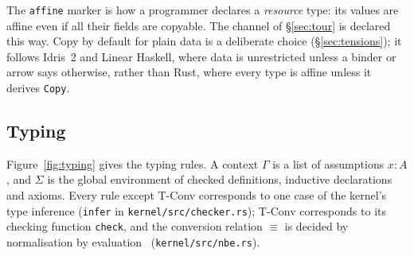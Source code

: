 The \lstinline|affine| marker is how a programmer declares a \emph{resource} type: its values are affine even if all their fields are copyable.
The channel of \S\ref{sec:tour} is declared this way.
Copy by default for plain data is a deliberate choice (\S\ref{sec:tensions}); it follows Idris~2 and Linear Haskell, where data is unrestricted unless a binder or arrow says otherwise, rather than Rust, where every type is affine unless it derives \lstinline|Copy|.

\subsection{Typing}\label{sec:core:typing}

Figure~\ref{fig:typing} gives the typing rules.
A context $\Gamma$ is a list of assumptions $x{:}A$, and $\Sigma$ is the global environment of checked definitions, inductive declarations and axioms.
Every rule except T-Conv corresponds to one case of the kernel's type inference (\texttt{infer} in \texttt{kernel/src/checker.rs}); T-Conv corresponds to its checking function \texttt{check}, and the conversion relation $\equiv$ is decided by normalisation by evaluation~\cite{abel2013} (\texttt{kernel/src/nbe.rs}).


